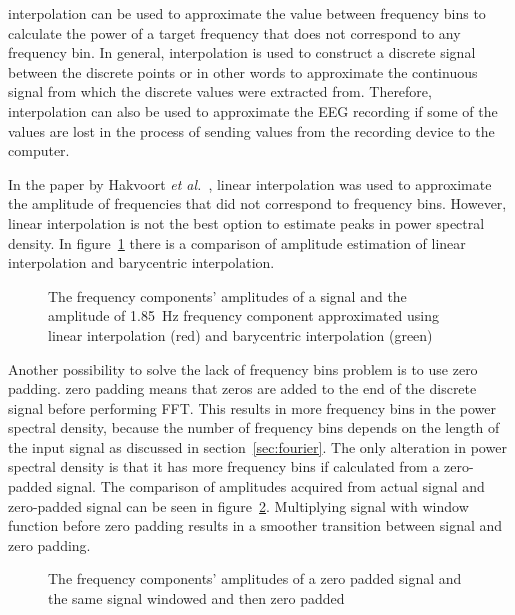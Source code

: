 \Gls{interpolation} can be used to approximate the value between \glspl{frequency bin} to calculate the power of a \gls{target} frequency that does not correspond to any \gls{frequency bin}. In general, \gls{interpolation} is used to construct a discrete signal between the discrete points or in other words to approximate the continuous signal from which the discrete values were extracted from. Therefore, \gls{interpolation} can also be used to approximate the \gls{EEG} recording if some of the values are lost in the process of sending values from the recording device to the computer.

In the paper by Hakvoort \textit{et al.}~\cite{cca_psda}, linear interpolation was used to approximate the amplitude of frequencies that did not correspond to \glspl{frequency bin}. However, linear interpolation is not the best option to estimate peaks in \gls{power spectral density}. In figure~\ref{fig:interpolation} there is a comparison of amplitude estimation of linear interpolation and barycentric interpolation.

\begin{figure}[h!]
	
	\caption{The frequency components' amplitudes of a signal and the amplitude of \SI{1.85}{Hz} frequency component approximated using linear interpolation (red) and barycentric interpolation (green)}
	\label{fig:interpolation}
\end{figure}

Another possibility to solve the lack of \glspl{frequency bin} problem is to use \gls{zero padding}. \Gls{zero padding} means that zeros are added to the end of the discrete signal before performing \gls{FFT}. This results in more \glspl{frequency bin} in the \gls{power spectral density}, because the number of \glspl{frequency bin} depends on the length of the input signal as discussed in section~\ref{sec:fourier}. The only alteration in \gls{power spectral density} is that it has more \glspl{frequency bin} if calculated from a zero-padded signal. The comparison of amplitudes acquired from actual signal and zero-padded signal can be seen in figure~\ref{fig:zero_padding}. Multiplying signal with window function before zero padding results in a smoother transition between signal and zero padding.

\begin{figure}[h!]
	
	\caption{The frequency components' amplitudes of a zero padded signal and the same signal windowed and then zero padded}
	\label{fig:zero_padding}
\end{figure}

